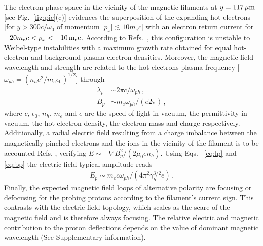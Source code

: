\documentclass[aps,twocolumn,showpacs,superscriptaddress]{revtex4}
\begin{document}
The electron phase space in the vicinity of the magnetic filaments at $y = 117\,\rm \mu m$ [see Fig.~\ref{fig:pic}(c)] evidences the superposition of the expanding hot electrons [for  $y > 300c/\omega_0$ of momentum $\vert p_x \vert \lesssim 10 m_ec$] with an electron return current for $-20 m_ec < p_x< -10\,\rm m_e c$.
According to Refs.~\cite{POP_Ren_2006, PRL_Gode_2017}, 
this configuration is unstable to Weibel-type instabilities with a maximum growth rate obtained for equal hot-electron and background plasma electron densities. Moreover, the magnetic-field wavelength and strength are related to the hot electrons plasma frequency [$\omega_{ph}=(n_h e^2/m_e \epsilon_0)^{1/2}$] through 
\begin{align}
 \lambda_p &\sim  2\pi c/\omega_{ph} \label{eq:lp}  \, ,\\
 B_p       &\sim m_e \omega_{ph}/(e2\pi) \label{eq:bp} \, , 
\end{align}
where $c$, $\epsilon_0$, $n_h$, $m_e$ and $e$  are the speed of light in vacuum, the permittivity in vacuum, the hot electron density, the electron mass and  charge respectively.
Additionally, a radial electric field resulting from a charge imbalance between the magnetically pinched electrons and the ions in the vicinity of the filament is to be accounted Refs. \cite{POP_Dieckmann_2009, POP_Bret_Gremillet_2010}, verifying $E\sim - \nabla B_p^2/(2 \mu_0e n_h)$. Using Eqs.~ \eqref{eq:lp} and \eqref{eq:bp} the electric field typical amplitude reads
\begin{align} 
E_p\sim m_ec\omega_{ph} /(4\pi^2\gamma_h^{3/2} e) \label{eq:ep} \, .
\end{align}
Finally, the expected magnetic field loops of alternative polarity are focusing or defocusing for the probing protons according to the filament's current sign. This contrasts with the electric field  topology, which scales as the scare of the magnetic field and is therefore always focusing. 
The relative electric and magnetic contribution to the proton deflections depends on the value of dominant magnetic wavelength (See Supplementary information). 
\end{document}

